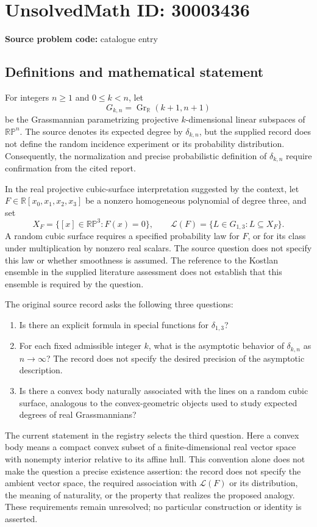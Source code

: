 \documentclass[11pt]{article}
\newcommand{\R}{\mathbb{R}}
\begin{document}
\section*{UnsolvedMath ID: 30003436}
\textbf{Source problem code:} catalogue entry
\subsection{Definitions and mathematical statement}
For integers \(n\geq 1\) and \(0\leq k<n\), let
\[
G_{k,n}=\operatorname{Gr}_{\R}(k+1,n+1)
\]
be the Grassmannian parametrizing projective \(k\)-dimensional linear subspaces of \(\mathbb{RP}^{n}\). The source denotes its expected degree by \(\delta_{k,n}\), but the supplied record does not define the random incidence experiment or its probability distribution. Consequently, the normalization and precise probabilistic definition of \(\delta_{k,n}\) require confirmation from the cited report.

In the real projective cubic-surface interpretation suggested by the context, let \(F\in\R[x_0,x_1,x_2,x_3]\) be a nonzero homogeneous polynomial of degree three, and set
\[
X_F=\{[x]\in\mathbb{RP}^{3}:F(x)=0\},\qquad
\mathcal{L}(F)=\{L\in G_{1,3}:L\subseteq X_F\}.
\]
A random cubic surface requires a specified probability law for \(F\), or for its class under multiplication by nonzero real scalars. The source question does not specify this law or whether smoothness is assumed. The reference to the Kostlan ensemble in the supplied literature assessment does not establish that this ensemble is required by the question.

The original source record asks the following three questions:
\begin{enumerate}
\item Is there an explicit formula in special functions for \(\delta_{1,3}\)?
\item For each fixed admissible integer \(k\), what is the asymptotic behavior of \(\delta_{k,n}\) as \(n\to\infty\)? The record does not specify the desired precision of the asymptotic description.
\item Is there a convex body naturally associated with the lines on a random cubic surface, analogous to the convex-geometric objects used to study expected degrees of real Grassmannians?
\end{enumerate}
The current statement in the registry selects the third question. Here a convex body means a compact convex subset of a finite-dimensional real vector space with nonempty interior relative to its affine hull. This convention alone does not make the question a precise existence assertion: the record does not specify the ambient vector space, the required association with \(\mathcal{L}(F)\) or its distribution, the meaning of naturality, or the property that realizes the proposed analogy. These requirements remain unresolved; no particular construction or identity is asserted.
\end{document}
